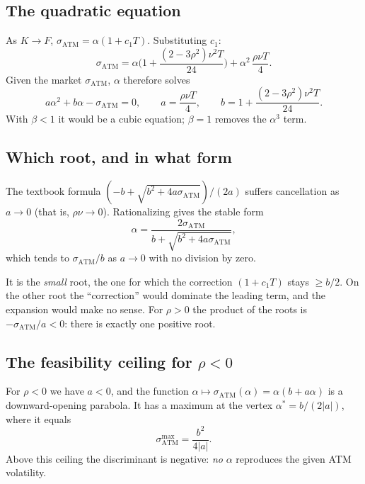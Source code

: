 \subsection{The quadratic equation}
As $K\to F$, $\sigma_{\mathrm{ATM}}=\alpha(1+c_1T)$. Substituting $c_1$:
\[
\sigma_{\mathrm{ATM}}=\alpha\Big(1+\frac{(2-3\rho^2)\nu^2T}{24}\Big)+\alpha^2\,\frac{\rho\nu T}{4}.
\]
Given the market $\sigma_{\mathrm{ATM}}$, $\alpha$ therefore solves
\begin{equation}\label{eq:alpha-atm}
a\alpha^2+b\alpha-\sigma_{\mathrm{ATM}}=0,\qquad a=\frac{\rho\nu T}{4},\qquad b=1+\frac{(2-3\rho^2)\nu^2T}{24}.
\end{equation}
With $\beta<1$ it would be a cubic equation; $\beta=1$ removes the $\alpha^3$ term.

\subsection{Which root, and in what form}
The textbook formula $(-b+\sqrt{b^2+4a\sigma_{\mathrm{ATM}}})/(2a)$ suffers cancellation as $a\to0$ (that is,
$\rho\nu\to0$). Rationalizing gives the stable form
\begin{equation}\label{eq:alpha-stabile}
\alpha=\frac{2\sigma_{\mathrm{ATM}}}{b+\sqrt{b^2+4a\sigma_{\mathrm{ATM}}}},
\end{equation}
which tends to $\sigma_{\mathrm{ATM}}/b$ as $a\to0$ with no division by zero.

It is the \emph{small} root, the one for which the correction $(1+c_1T)$ stays $\ge b/2$. On the other root the
``correction'' would dominate the leading term, and the expansion would make no sense. For $\rho>0$ the product of
the roots is $-\sigma_{\mathrm{ATM}}/a<0$: there is exactly one positive root.

\subsection{\texorpdfstring{The feasibility ceiling for $\rho<0$}{The feasibility ceiling for ρ<0}}
For $\rho<0$ we have $a<0$, and the function $\alpha\mapsto\sigma_{\mathrm{ATM}}(\alpha)=\alpha(b+a\alpha)$ is a
downward-opening parabola. It has a maximum at the vertex $\alpha^*=b/(2|a|)$, where it equals
\begin{equation}\label{eq:tetto}
\sigma_{\mathrm{ATM}}^{\max}=\frac{b^2}{4|a|}.
\end{equation}
Above this ceiling the discriminant is negative: \emph{no} $\alpha$ reproduces the given ATM volatility.

